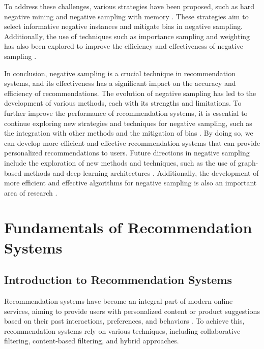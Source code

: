 \documentclass[11pt,a4paper]{article}
\begin{document}
To address these challenges, various strategies have been proposed, such as hard negative mining and negative sampling with memory \cite{doi:10.1145/3539618.3591995}. These strategies aim to select informative negative instances and mitigate bias in negative sampling. Additionally, the use of techniques such as importance sampling and weighting has also been explored to improve the efficiency and effectiveness of negative sampling \cite{doi:10.1145/3366423.3380187}.

In conclusion, negative sampling is a crucial technique in recommendation systems, and its effectiveness has a significant impact on the accuracy and efficiency of recommendations. The evolution of negative sampling has led to the development of various methods, each with its strengths and limitations. To further improve the performance of recommendation systems, it is essential to continue exploring new strategies and techniques for negative sampling, such as the integration with other methods and the mitigation of bias \cite{doi:10.1109/tpami.2024.3371473}. By doing so, we can develop more efficient and effective recommendation systems that can provide personalized recommendations to users. Future directions in negative sampling include the exploration of new methods and techniques, such as the use of graph-based methods and deep learning architectures \cite{doi:10.1145/3604915.3610236}. Additionally, the development of more efficient and effective algorithms for negative sampling is also an important area of research \cite{doi:10.1145/3539597.3570392}.


\section{Fundamentals of Recommendation Systems}



\subsection{Introduction to Recommendation Systems}


Recommendation systems have become an integral part of modern online services, aiming to provide users with personalized content or product suggestions based on their past interactions, preferences, and behaviors \cite{doi:10.1145/2983323.2983874}. To achieve this, recommendation systems rely on various techniques, including collaborative filtering, content-based filtering, and hybrid approaches. 
\end{document}
